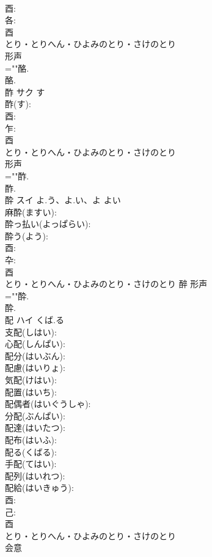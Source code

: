 \documentclass[8pt]{extreport}
\begin{document}
\begin{CJK}{UTF8}{min}
\\	酉: 
\\	各: 
\\	酉	
\\	とり・とりへん・ひよみのとり・さけのとり	
\\	形声 
\\	=""酪.
\\	酪.
\\	酢	サク	す		
\\	酢(す): 
\\	酉: 
\\	乍: 
\\	酉	
\\	とり・とりへん・ひよみのとり・さけのとり	
\\	形声 
\\	=""酢.
\\	酢.
\\	酔	スイ	よ.う、よ.い、よ	よい	
\\	麻酔(ますい): 
\\	酔っ払い(よっぱらい): 
\\	酔う(よう): 
\\	酉: 
\\	卆: 
\\	酉	
\\	とり・とりへん・ひよみのとり・さけのとり	醉	形声 
\\	=""酔.
\\	酔.
\\	配	ハイ	くば.る		
\\	支配(しはい): 
\\	心配(しんぱい): 
\\	配分(はいぶん): 
\\	配慮(はいりょ): 
\\	気配(けはい): 
\\	配置(はいち): 
\\	配偶者(はいぐうしゃ): 
\\	分配(ぶんぱい): 
\\	配達(はいたつ): 
\\	配布(はいふ): 
\\	配る(くばる): 
\\	手配(てはい): 
\\	配列(はいれつ): 
\\	配給(はいきゅう): 
\\	酉: 
\\	己: 
\\	酉	
\\	とり・とりへん・ひよみのとり・さけのとり	
\\	会意 

\end{CJK}
\end{document}
